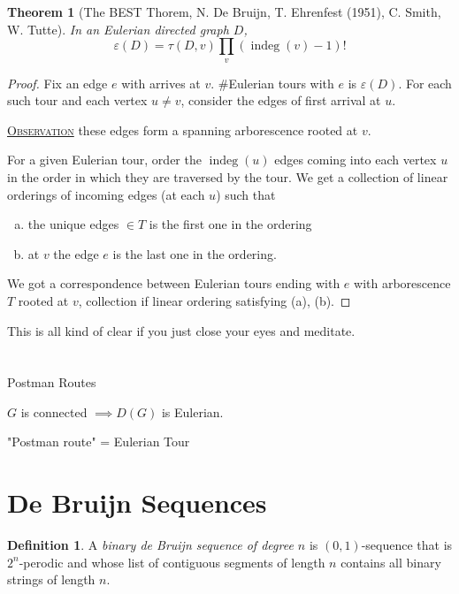 \documentclass{report}
\newcommand{\fancyem}[1]{\underline{\textsc{#1}}}
\newtheorem{theorem}{Theorem}[section]
\theoremstyle{definition}
\newtheorem{definition}{Definition}[section]
\theoremstyle{remark}
\numberwithin{equation}{section}
\begin{document}
\begin{theorem}[The BEST Thorem, N. De Bruijn, T. Ehrenfest (1951), C. Smith, W. Tutte]
    In an Eulerian directed graph $D$,
    \[
    \varepsilon(D) = \tau(D, v)\prod_v (\operatorname{indeg}(v) - 1)!    
    \]
\end{theorem}
\begin{proof}
    Fix an edge $e$ with arrives at $v$. $\#$Eulerian tours with $e$ is $\varepsilon(D)$. For each such tour and each vertex $u \neq v$, consider the edges of first arrival at $u$.

    \fancyem{Observation} these edges form a spanning arborescence rooted at $v$.

    For a given Eulerian tour, order the $\operatorname{indeg}(u)$ edges coming into each vertex $u$ in the order in which they are traversed by the tour. We get a collection of linear orderings of incoming edges (at each $u$) such that 
    \begin{enumerate}[(a)]
        \item the unique edges $\in T$ is the first one in the ordering
        \item at $v$ the edge $e$ is the last one in the ordering.
    \end{enumerate}
    We got a correspondence between Eulerian tours ending with $e$ with arborescence $T$ rooted at $v$, collection if linear ordering satisfying (a), (b).
\end{proof}

\epigraph{This is all kind of clear if you just close your eyes and meditate.}{}

\section{}

Postman Routes

$G$ is connected $\implies D(G)$ is Eulerian.

"Postman route" = Eulerian Tour

\section{De Bruijn Sequences}
\begin{definition}
    A \emph{binary de Bruijn sequence of degree $n$} is $(0, 1)$-sequence that is $2^n$-perodic and whose list of contiguous segments of length $n$ contains all binary strings of length $n$.
\end{definition}
\end{document}
